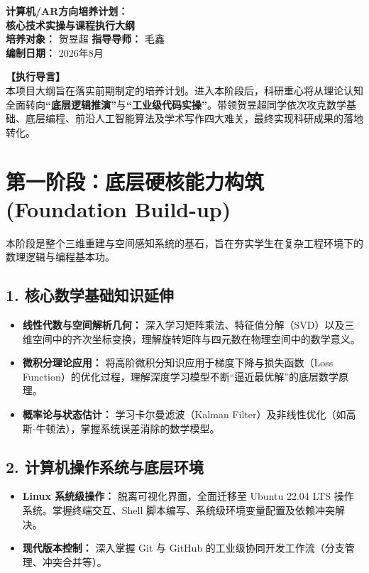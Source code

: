 \documentclass[11pt, a4paper]{ctexart}
\begin{document}
\begin{center}
    {\huge\bfseries 计算机/AR方向培养计划：\\ [0.5em] 核心技术实操与课程执行大纲} \\ [2em]
   
    {\large \textbf{培养对象：} 贺昱超} \hspace{2em} {\large \textbf{指导导师：} 毛鑫} \\ [1em]
    {\large \textbf{编制日期：} 2026年8月} \\ [2em]
\end{center}

\vspace{1em}

\noindent\textbf{【执行导言】} \\
本项目大纲旨在落实前期制定的培养计划。进入本阶段后，科研重心将从理论认知全面转向\textbf{“底层逻辑推演”}与\textbf{“工业级代码实操”}。带领贺昱超同学依次攻克数学基础、底层编程、前沿人工智能算法及学术写作四大难关，最终实现科研成果的落地转化。

\section{第一阶段：底层硬核能力构筑 (Foundation Build-up)}

本阶段是整个三维重建与空间感知系统的基石，旨在夯实学生在复杂工程环境下的数理逻辑与编程基本功。

\subsection{1. 核心数学基础知识延伸}
\begin{itemize}[label=$\bullet$]
    \item \textbf{线性代数与空间解析几何：} 深入学习矩阵乘法、特征值分解（SVD）以及三维空间中的齐次坐标变换，理解旋转矩阵与四元数在物理空间中的数学意义。
    \item \textbf{微积分理论应用：} 将高阶微积分知识应用于梯度下降与损失函数（Loss Function）的优化过程，理解深度学习模型不断“逼近最优解”的底层数学原理。
    \item \textbf{概率论与状态估计：} 学习卡尔曼滤波（Kalman Filter）及非线性优化（如高斯-牛顿法），掌握系统误差消除的数学模型。
\end{itemize}

\subsection{2. 计算机操作系统与底层环境}
\begin{itemize}[label=$\bullet$]
    \item \textbf{Linux 系统级操作：} 脱离可视化界面，全面迁移至 Ubuntu 22.04 LTS 操作系统。掌握终端交互、Shell 脚本编写、系统级环境变量配置及依赖冲突解决。
    \item \textbf{现代版本控制：} 深入掌握 Git 与 GitHub 的工业级协同开发工作流（分支管理、冲突合并等）。
\end{itemize}
\end{document}
